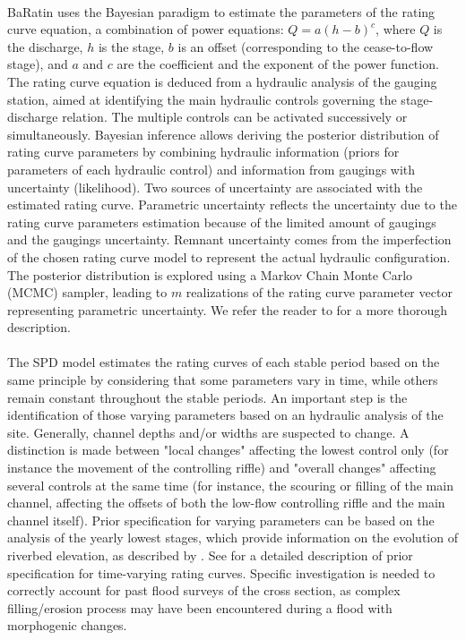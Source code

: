     \paragraph{} BaRatin uses the Bayesian paradigm to estimate the parameters of the rating curve equation, a combination of power equations: $Q = a(h-b)^c$, where $Q$ is the discharge, $h$ is the stage, $b$ is an offset (corresponding to the cease-to-flow stage), and $a$ and $c$ are the coefficient and the exponent of the power function. The rating curve equation is deduced from a hydraulic analysis of the gauging station, aimed at identifying the main hydraulic controls governing the stage-discharge relation. The multiple controls can be activated successively or simultaneously. Bayesian inference allows deriving the posterior distribution of rating curve parameters by combining hydraulic information (priors for parameters of each hydraulic control) and information from gaugings with uncertainty (likelihood). Two sources of uncertainty are associated with the estimated rating curve. Parametric uncertainty reflects the uncertainty due to the rating curve parameters estimation because of the limited amount of gaugings and the gaugings uncertainty. Remnant uncertainty comes from the imperfection of the chosen rating curve model to represent the actual hydraulic configuration. The posterior distribution is explored using a Markov Chain Monte Carlo (MCMC) sampler, leading to $m$ realizations of the rating curve parameter vector representing parametric uncertainty. We refer the reader to \citet{le_coz_combining_2014} for a more thorough description.

    \paragraph{}
    The SPD model estimates the rating curves of each stable period based on the same principle by considering that some parameters vary in time, while others remain constant throughout the stable periods. An important step is the identification of those varying parameters based on an hydraulic analysis of the site. Generally, channel depths and/or widths are suspected to change. A distinction is made between "local changes" affecting the lowest control only (for instance the movement of the controlling riffle) and "overall changes" affecting several controls at the same time (for instance, the scouring or filling of the main channel, affecting the offsets of both the low-flow controlling riffle and the main channel itself). Prior specification for varying parameters can be based on the analysis of the yearly lowest stages, which provide information on the evolution of riverbed elevation, as described by \citet{lapuszek_methods_2015}. See \citet{mansanarez_shift_2019} for a detailed description of prior specification for time-varying rating curves. Specific investigation is needed to correctly account for past flood surveys of the cross section, as complex filling/erosion process may have been encountered during a flood with morphogenic changes.
    
